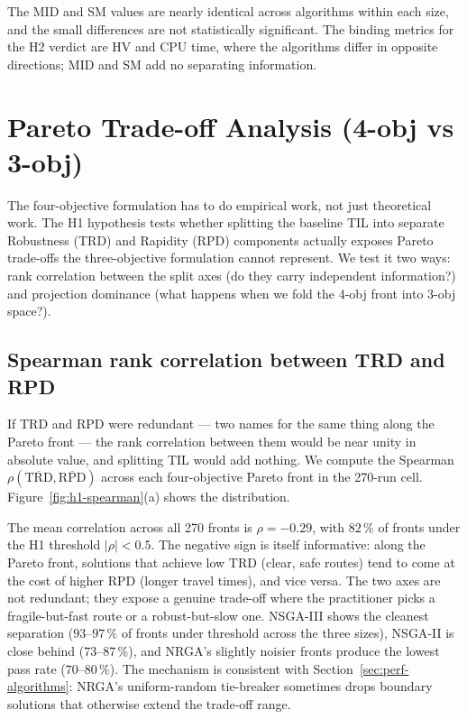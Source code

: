 \documentclass[applsci,article,submit,moreauthors,pdftex]{Definitions/mdpi}
\begin{document}
The MID and SM values are nearly identical across algorithms within each
size, and the small differences are not statistically significant. The binding
metrics for the H2 verdict are HV and CPU time, where the algorithms differ in
opposite directions; MID and SM add no separating information.

\section{Pareto Trade-off Analysis (4-obj vs 3-obj)}\label{sec:tradeoff-analysis}

The four-objective formulation has to do empirical work, not just
theoretical work. The H1 hypothesis tests whether splitting the baseline TIL
into separate Robustness (TRD) and Rapidity (RPD) components actually
exposes Pareto trade-offs the three-objective formulation cannot represent.
We test it two ways: rank correlation between the split axes (do they carry
independent information?) and projection dominance (what happens when we
fold the 4-obj front into 3-obj space?).

\subsection{Spearman rank correlation between TRD and RPD}\label{sec:h1-spearman}

If TRD and RPD were redundant --- two names for the same thing along the
Pareto front --- the rank correlation between them would be near unity in
absolute value, and splitting TIL would add nothing. We compute the Spearman
$\rho(\overline{\mathrm{TRD}}, \overline{\mathrm{RPD}})$ across each
four-objective Pareto front in the 270-run cell.
Figure~\ref{fig:h1-spearman}(a) shows the distribution.

The mean correlation across all 270 fronts is $\rho = -0.29$, with $82\,\%$
of fronts under the H1 threshold $|\rho| < 0.5$. The negative sign is itself
informative: along the Pareto front, solutions that achieve low TRD (clear,
safe routes) tend to come at the cost of higher RPD (longer travel times),
and vice versa. The two axes are not redundant; they expose a genuine
trade-off where the practitioner picks a fragile-but-fast route or a
robust-but-slow one. NSGA-III shows the cleanest separation
($93$--$97\,\%$ of fronts under threshold across the three sizes), NSGA-II
is close behind ($73$--$87\,\%$), and NRGA's slightly noisier fronts
produce the lowest pass rate ($70$--$80\,\%$). The mechanism is consistent
with Section~\ref{sec:perf-algorithms}: NRGA's uniform-random tie-breaker
sometimes drops boundary solutions that otherwise extend the trade-off
range.
\end{document}
